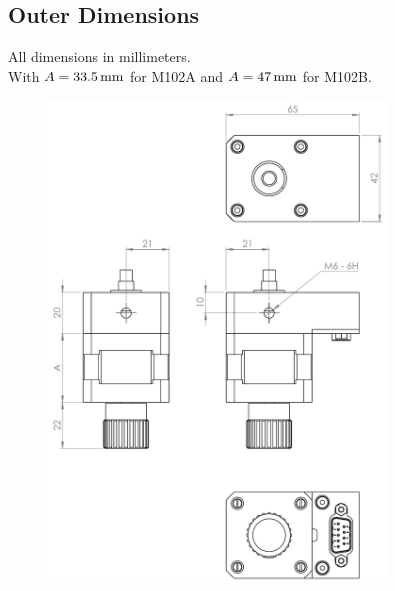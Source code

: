 \documentclass[a4paper, final, 12pt, oneside]{scrartcl}
\numberwithin{equation}{section}
\numberwithin{table}{section}
\numberwithin{figure}{section}
\begin{document}
\FloatBarrier
\newpage

\subsection*{Outer Dimensions}
All dimensions in millimeters.\\
With $A = \unit[33.5]{mm}$ for M102A and $A = \unit[47]{mm}$ for M102B.
\begin{figure}[!htp]
  \centering
  \includegraphics[angle=0,origin=c,width=0.8\textwidth]{./drawings/M102_outline_dimensions.pdf}
\end{figure}
\FloatBarrier
\end{document}
